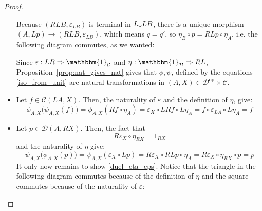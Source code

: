 \begin{proof}
\begin{itemize}
\begin{center}
\end{center}
Because $(RLB,\varepsilon_{LB})$ is terminal in $L\mkern-5mu\downarrow\mkern-5mu LB$, there is a unique morphism $(A,Lp)\to(RLB,\varepsilon_{LB})$, which means $q=q'$, so $\eta_B\circ p=RLp\circ\eta_A$, i.e. the following diagram commutes, as we wanted:
\begin{center}
\end{center}
Since $\varepsilon:LR\Rightarrow\mathbbm{1}_{\mathcal{C}}$ and $\eta:\mathbbm{1}_{\mathcal{D}}\Rightarrow RL$, Proposition~\ref{prop:nat_gives_nat} gives that $\phi,\psi$, defined by the equations \eqref{iso_from_unit} are natural transformations in $(A,X)\in\mathcal{D}^{\mathrm{op}}\times\mathcal{C}$.
\item Let $f\in\mathcal{C}(LA,X)$. Then, the naturality of $\varepsilon$ and the definition of $\eta$, give:
\[\phi_{A,X}\big(\psi_{A,X}(f)\big)=\phi_{A,X}(Rf\circ\eta_A)=\varepsilon_X\circ LRf\circ L\eta_A=f\circ\varepsilon_{LA}\circ L\eta_A=f\]
\item Let $p\in\mathcal{D}(A,RX)$. Then, the fact that
\begin{equation}\label{duel_eta_eps}
R\varepsilon_X\circ\eta_{RX}=1_{RX}
\end{equation}
and the naturality of $\eta$ give:
\[\psi_{A,X}\big(\phi_{A,X}(p)\big)=\psi_{A,X}(\varepsilon_X\circ Lp)=R\varepsilon_X\circ RLp\circ\eta_A=R\varepsilon_X\circ\eta_{RX}\circ p=p\]
It only now remains to show \eqref{duel_eta_eps}. Notice that the triangle in the following diagram commutes because of the definition of $\eta$ and the square commutes because of the naturality of $\varepsilon$:
\begin{center}
\end{center}

\end{itemize}
\end{proof}
